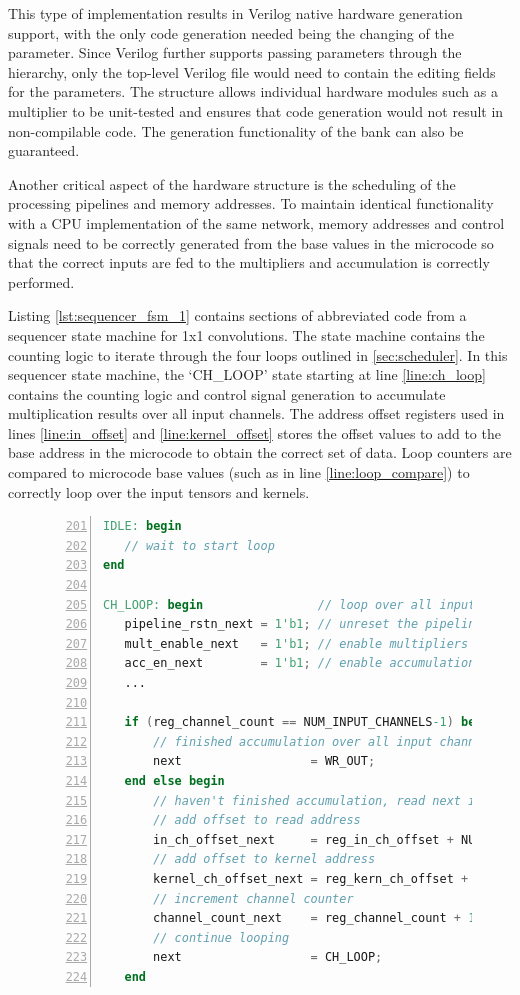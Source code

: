 \documentclass{uw-ece-wkrpt}
\begin{document}
This type of implementation results in Verilog native hardware generation support, with the only code generation needed being the changing of the parameter. Since Verilog further supports passing parameters through the hierarchy, only the top-level Verilog file would need to contain the editing fields for the parameters. The structure allows individual hardware modules such as a multiplier to be unit-tested and ensures that code generation would not result in non-compilable code. The generation functionality of the bank can also be guaranteed.

Another critical aspect of the hardware structure is the scheduling of the processing pipelines and memory addresses. To maintain identical functionality with a CPU implementation of the same network, memory addresses and control signals need to be correctly generated from the base values in the microcode so that the correct inputs are fed to the multipliers and accumulation is correctly performed.

Listing \ref{lst:sequencer_fsm_1} contains sections of abbreviated code from a sequencer state machine for 1x1 convolutions. The state machine contains the counting logic to iterate through the four loops outlined in \ref{sec:scheduler}. In this sequencer state machine, the `CH\_LOOP' state starting at line \ref{line:ch_loop} contains the counting logic and control signal generation to accumulate multiplication results over all input channels. The address offset registers used in lines \ref{line:in_offset} and \ref{line:kernel_offset} stores the offset values to add to the base address in the microcode to obtain the correct set of data. Loop counters are compared to microcode base values (such as in line \ref{line:loop_compare}) to correctly loop over the input \glspl{tensor} and \glspl{kernel}.

\begin{figure}
\centering
\begin{lstlisting}[caption={Sequencer state machine part 1}, label=lst:sequencer_fsm_1, language=Verilog, escapechar=|, numbers=left, firstnumber=201]
IDLE: begin
   // wait to start loop
end

CH_LOOP: begin                // loop over all input channels |\label{line:ch_loop}|
   pipeline_rstn_next = 1'b1; // unreset the pipeline
   mult_enable_next   = 1'b1; // enable multipliers
   acc_en_next        = 1'b1; // enable accumulation
   ...

   if (reg_channel_count == NUM_INPUT_CHANNELS-1) begin |\label{line:loop_compare}|
       // finished accumulation over all input channels, write out current tile
       next                  = WR_OUT;
   end else begin
       // haven't finished accumulation, read next input channel to accumulate
       // add offset to read address
       in_ch_offset_next     = reg_in_ch_offset + NUM_TILES; |\label{line:in_offset}|
       // add offset to kernel address
       kernel_ch_offset_next = reg_kern_ch_offset + 1; |\label{line:kernel_offset}|
       // increment channel counter
       channel_count_next    = reg_channel_count + 1;
       // continue looping
       next                  = CH_LOOP;
   end
\end{lstlisting}
\end{figure}
\end{document}
